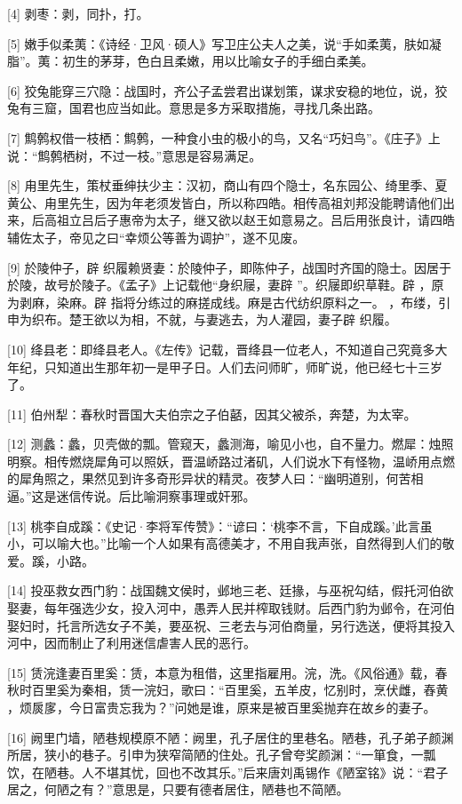 \documentclass[12pt,UTF8]{ctexbook}
\begin{document}
[4] 剥枣：剥，同扑，打。

[5] 嫩手似柔荑：《诗经·卫风·硕人》写卫庄公夫人之美，说“手如柔荑，肤如凝脂”。荑：初生的茅芽，色白且柔嫩，用以比喻女子的手细白柔美。

[6] 狡兔能穿三穴隐：战国时，齐公子孟尝君出谋划策，谋求安稳的地位，说，狡兔有三窟，国君也应当如此。意思是多方采取措施，寻找几条出路。

[7] 鹪鹩权借一枝栖：鹪鹩，一种食小虫的极小的鸟，又名“巧妇鸟”。《庄子》上说：“鹪鹩栖树，不过一枝。”意思是容易满足。

[8] 甪里先生，策杖垂绅扶少主：汉初，商山有四个隐士，名东园公、绮里季、夏黄公、甪里先生，因为年老须发皆白，所以称四皓。相传高祖刘邦没能聘请他们出来，后高祖立吕后子惠帝为太子，继又欲以赵王如意易之。吕后用张良计，请四皓辅佐太子，帝见之曰“幸烦公等善为调护”，遂不见废。

[9] 於陵仲子，辟 织履赖贤妻：於陵仲子，即陈仲子，战国时齐国的隐士。因居于於陵，故号於陵子。《孟子》上记载他“身织屦，妻辟 ”。织屦即织草鞋。辟 ，原为剥麻，染麻。辟 指将分练过的麻搓成线。麻是古代纺织原料之一。 ，布缕，引申为织布。楚王欲以为相，不就，与妻逃去，为人灌园，妻子辟 织履。

[10] 绛县老：即绛县老人。《左传》记载，晋绛县一位老人，不知道自己究竟多大年纪，只知道出生那年初一是甲子日。人们去问师旷，师旷说，他已经七十三岁了。

[11] 伯州犁：春秋时晋国大夫伯宗之子伯嚭，因其父被杀，奔楚，为太宰。

[12] 测蠡：蠡，贝壳做的瓢。管窥天，蠡测海，喻见小也，自不量力。燃犀：烛照明察。相传燃烧犀角可以照妖，晋温峤路过渚矶，人们说水下有怪物，温峤用点燃的犀角照之，果然见到许多奇形异状的精灵。夜梦人曰：“幽明道别，何苦相逼。”这是迷信传说。后比喻洞察事理或奸邪。

[13] 桃李自成蹊：《史记·李将军传赞》：“谚曰：‘桃李不言，下自成蹊。’此言虽小，可以喻大也。”比喻一个人如果有高德美才，不用自我声张，自然得到人们的敬爱。蹊，小路。

[14] 投巫救女西门豹：战国魏文侯时，邺地三老、廷掾，与巫祝勾结，假托河伯欲娶妻，每年强选少女，投入河中，愚弄人民并榨取钱财。后西门豹为邺令，在河伯娶妇时，托言所选女子不美，要巫祝、三老去与河伯商量，另行选送，便将其投入河中，因而制止了利用迷信虐害人民的恶行。

[15] 赁浣逢妻百里奚：赁，本意为租借，这里指雇用。浣，洗。《风俗通》载，春秋时百里奚为秦相，赁一浣妇，歌曰：“百里奚，五羊皮，忆别时，烹伏雌，舂黄 ，烦扊扅，今日富贵忘我为？”问她是谁，原来是被百里奚抛弃在故乡的妻子。

[16] 阙里门墙，陋巷规模原不陋：阙里，孔子居住的里巷名。陋巷，孔子弟子颜渊所居，狭小的巷子。引申为狭窄简陋的住处。孔子曾夸奖颜渊：“一箪食，一瓢饮，在陋巷。人不堪其忧，回也不改其乐。”后来唐刘禹锡作《陋室铭》说：“君子居之，何陋之有？”意思是，只要有德者居住，陋巷也不简陋。
\end{document}
